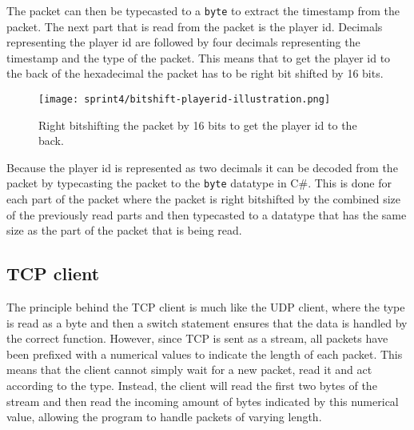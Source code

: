 The packet can then be typecasted to a \texttt{byte} to extract the timestamp from the packet.
The next part that is read from the packet is the player id.
Decimals representing the player id are followed by four decimals representing the timestamp and the type of the packet.
This means that to get the player id to the back of the hexadecimal the packet has to be right bit shifted by 16 bits.
\begin{figure}[H]
    \centering
    \texttt{[image: sprint4/bitshift-playerid-illustration.png]}
    \caption{Right bitshifting the packet by 16 bits to get the player id to the back.}
    \label{fig:sprint4-bitshift-playerid}
\end{figure}
Because the player id is represented as two decimals it can be decoded from the packet by typecasting the packet to the \texttt{byte} datatype in C\#.
This is done for each part of the packet where the packet is right bitshifted by the combined size of the previously read parts and then typecasted to a datatype that has the same size as the part of the packet that is being read.
\subsection*{TCP client}
The principle behind the TCP client is much like the UDP client, where the type is read as a byte and then a switch statement ensures that the data is handled by the correct function.
However, since TCP is sent as a stream, all packets have been prefixed with a numerical values to indicate the length of each packet.
This means that the client cannot simply wait for a new packet, read it and act according to the type.
Instead, the client will read the first two bytes of the stream and then read the incoming amount of bytes indicated by this numerical value, allowing the program to handle packets of varying length.
